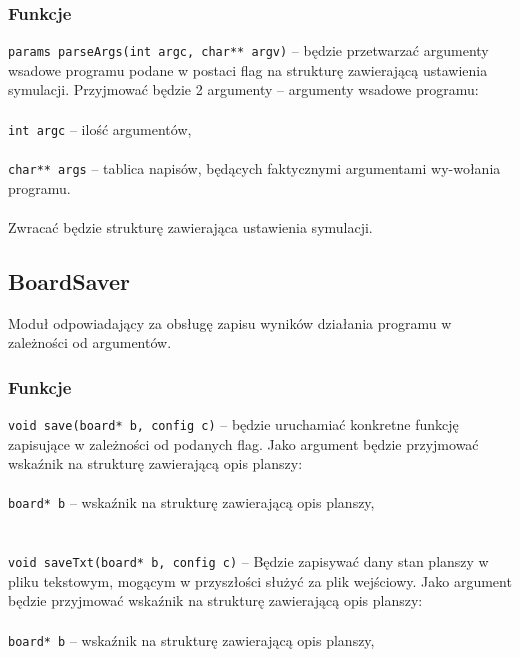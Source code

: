 \documentclass{article}
\begin{document}
\subsubsection{Funkcje}
\texttt{params parseArgs(int argc, char** argv)} -- będzie przetwarzać argumenty wsadowe programu podane w postaci flag na strukturę zawierającą ustawienia symulacji. Przyjmować będzie 2 argumenty -- argumenty wsadowe programu:\\\\
	 \hspace*{10mm}\texttt{int argc} -- ilość argumentów,\\\\
	 \hspace*{10mm}\texttt{char** args} -- tablica napisów, będących faktycznymi argumentami wy-\hspace*{10mm}wołania programu.\\
\\
Zwracać będzie strukturę zawierająca ustawienia symulacji.

\subsection{BoardSaver}
Moduł odpowiadający za obsługę zapisu wyników działania programu w zależności od argumentów.

\subsubsection{Funkcje}
\texttt{void save(board* b, config c)} -- będzie uruchamiać konkretne funkcję zapisujące w zależności od podanych flag. Jako argument będzie przyjmować wskaźnik na strukturę zawierającą opis planszy:\\\\
	 \hspace*{10mm}\texttt{board* b} -- wskaźnik na strukturę zawierającą opis planszy,\\\\
\\
\texttt{void saveTxt(board* b, config c)} -- Będzie zapisywać dany stan planszy w pliku tekstowym, mogącym w przyszłości służyć za plik wejściowy. Jako argument będzie przyjmować wskaźnik na strukturę zawierającą opis planszy:\\\\
	 \hspace*{10mm}\texttt{board* b} -- wskaźnik na strukturę zawierającą opis planszy,\\\\
\\
\end{document}

